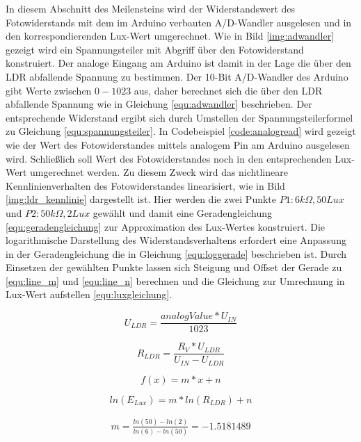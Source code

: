 In diesem Abschnitt des Meilensteins wird der Widerstandswert des Fotowiderstands mit dem im Arduino verbauten A/D-Wandler ausgelesen und in den korrespondierenden Lux-Wert umgerechnet. Wie in Bild \ref{img:adwandler} gezeigt wird ein Spannungsteiler mit Abgriff über den Fotowiderstand konstruiert. Der analoge Eingang am Arduino ist damit in der Lage die über den LDR abfallende Spannung zu bestimmen. Der 10-Bit A/D-Wandler des Arduino gibt Werte zwischen $0-1023$ aus, daher berechnet sich die über den LDR abfallende Spannung wie in Gleichung \ref{equ:adwandler} beschrieben. Der entsprechende Widerstand ergibt sich durch Umstellen der Spannungsteilerformel zu Gleichung \ref{equ:spannungsteiler}. In Codebeispiel \ref{code:analogread} wird gezeigt wie der Wert des Fotowiderstandes mittels analogem Pin am Arduino ausgelesen wird. Schließlich soll Wert des Fotowiderstandes noch in den entsprechenden Lux-Wert umgerechnet werden. Zu diesem Zweck wird das nichtlineare Kennlinienverhalten des Fotowiderstandes linearisiert, wie in Bild \ref{img:ldr_kennlinie} dargestellt ist. Hier werden die zwei Punkte $P1: 6k\Omega, 50Lux$ und $P2: 50k\Omega, 2Lux$ gewählt und damit eine Geradengleichung \ref{equ:geradengleichung} zur Approximation des Lux-Wertes konstruiert. Die logarithmische Darstellung des Widerstandsverhaltens erfordert eine Anpassung in der Geradengleichung die in Gleichung \ref{equ:loggerade} beschrieben ist. Durch Einsetzen der gewählten Punkte lassen sich Steigung und Offset der Gerade zu \ref{equ:line_m} und \ref{equ:line_n} berechnen und die Gleichung zur Umrechnung in Lux-Wert aufstellen \ref{equ:luxgleichung}. 

\begin{equation}
U_{LDR} = \frac{analogValue * U_{IN}}{1023}
\label{equ:adwandler}
\end{equation}

\begin{equation}
R_{LDR}=\frac{R_V * U_{LDR}}{U_{IN} - U_{LDR}}
\label{equ:spannungsteiler}
\end{equation}

\begin{equation}
f(x)=m*x+n
\label{equ:geradengleichung}
\end{equation}

\begin{equation}
ln(E_{Lux})=m*ln(R_{LDR})+n
\label{equ:loggerade}
\end{equation}

\begin{equation}
\begin{split}
m = \frac{ln(50)-ln(2)}{ln(6)-ln(50)} = -1.5181489
\end{split}
\label{equ:line_m}
\end{equation}

